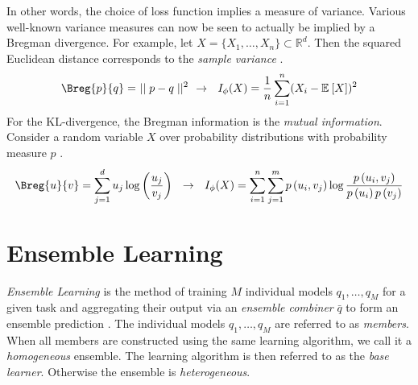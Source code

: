 \documentclass[
	twoside=false, %
]{kaobook}
\begin{document}
In other words, the choice of loss function implies a measure of variance. Various well-known variance measures can now be seen to actually be implied by a Bregman divergence.
For example, let $X = \{ X_{1}, \dots, X_{n} \} \subset \mathbb{R}^d$. Then the squared Euclidean distance corresponds to the \textit{sample variance} \cite{banerjee_ClusteringBregmanDivergences_2004}.
$$
\Breg{p}{q} =~\mid\mid p-q\mid\mid^2 ~ ~ \rightarrow ~ ~ 
I_{\phi}(X) = \frac{1}{n} \sum_{i=1}^n (X_{i} - \mathbb{E}_{}\left[ X \right] )^2
$$
For the KL-divergence, the Bregman information is the \textit{mutual information}. Consider a random variable $X$ over probability distributions with probability measure $p$ \cite{banerjee_ClusteringBregmanDivergences_2004}.
$$
\Breg{u}{v} = \sum_{j=1}^d u_{j} \log \left( \frac{u_{j}}{v_{j}} \right) 
~ ~ \rightarrow ~ ~  I_{\phi}(X) = 
\sum_{i=1}^n \sum_{j=1}^m p\left(u_i, v_j\right) \log \frac{p\left(u_i, v_j\right)}{p\left(u_i\right) p\left(v_j\right)}
$$






\chapter{Ensemble Learning}
\label{chapter:ensemble-learning}

\textit{Ensemble Learning} is the method of training $M$ individual models $q_{1}, \dots, q_{M}$ for a given task and aggregating their output via an \textit{ensemble combiner} $\bar{q}$ to form an ensemble prediction \cite{zhou_EnsembleMethodsFoundations_2012}.
The individual models $q_{1}, \dots, q_{M}$ are referred to as \textit{members}. When all members are constructed using the same learning algorithm, we call it a \textit{homogeneous} ensemble. The learning algorithm is then referred to as the \textit{base learner}. Otherwise the ensemble is \textit{heterogeneous}. 
\end{document}
